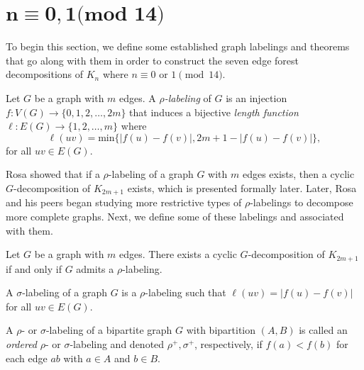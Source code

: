 \chapter{$\mathbf{n\equiv 0,1\textbf{(mod 14)}}$} \label{chap:0,1(mod 14)}

To begin this section, we define some established graph labelings and theorems that go along with them in order to construct the seven edge forest decompositions of $K_n$ where $n \equiv 0 \textrm{ or } 1 \pmod{14}$. 



\begin{definition} \label{def:rho} 
 Let $G$ be a graph with $m$ edges.  A \textit{$\rho$-labeling} of $G$ is an injection $f: V(G) \rightarrow \{0,1,2, \dots, 2m\}$ that induces a bijective \textit{length function $\ell: E(G) \rightarrow \{1,2, \dots, m\}$} where 
    $$
    \ell(uv) = \text{min}\{|f(u)-f(v)|,2m+1-|f(u)-f(v)|\},
    $$
for all  $uv \in E(G)$.
\end{definition}

Rosa showed that if a $\rho$-labeling of a graph $G$ with $m$ edges exists, then a cyclic $G$-decomposition of $K_{2m+1}$ exists, which is presented formally later. Later, Rosa and his peers began studying more restrictive types of $\rho$-labelings to decompose more complete graphs. Next, we define some of these labelings and associated with them.

\begin{thm}\label{thm:Rhosa}  
Let $G$ be a graph with $m$ edges.  There exists a cyclic $G$-decomposition of $K_{2m+1}$ if and only if $G$ admits a $\rho$-labeling.
\end{thm}

\begin{definition} \label{def:sigma} 
A $\sigma$-labeling of a graph $G$ is a $\rho$-labeling such that $\ell(uv) = |f(u) - f(v)|$ for all $uv \in E(G).$
\end{definition}

\begin{definition} \label{def:rho and sigma ordered def} 
A $\rho$- or $\sigma$-labeling of a bipartite graph $G$ with bipartition $(A,B)$ is called an \emph{ordered} $\rho$- or $\sigma$-labeling and denoted $\rho^+,\sigma^+$, respectively, if $f(a) < f(b)$ for each edge $ab$ with $a \in A$ and $b \in B$.
\end{definition}

